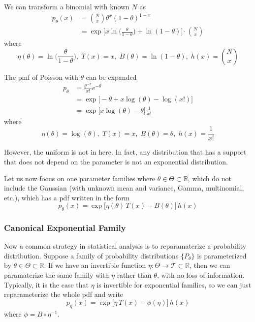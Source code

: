 \documentclass{article}
\begin{document}
    \begin{example}
    We can transform a binomial with known $N$ as 
    \begin{align*}
      p_\theta (x) &  = \binom{N}{x} \theta^x  (1 - \theta)^{1 - x} \\
                   & = \exp \bigg[ x \ln \big( \frac{\theta}{1 - \theta} \Big) + \ln(1 - \theta) \bigg] \cdot \binom{N}{x} 
    \end{align*}
    where 
      \[\eta (\theta) = \ln \big( \frac{\theta}{1 - \theta} \Big), \; T(x) = x, \; B(\theta) = \ln(1 - \theta), \; h(x) = \binom{N}{x}\]
    \end{example}

    \begin{example}[Poisson]
    The pmf of Poisson with $\theta$ can be expanded 
    \begin{align*}
        p_\theta & = \frac{\theta^{-x}}{x!} e^{-\theta} \\
        & = \exp \big[ -\theta + x\log(\theta) - \log(x!) \big] \\
        & = \exp \big[ x \log(\theta) - \theta \big] \, \frac{1}{x!}
    \end{align*}
    where 
    \[\eta(\theta) = \log(\theta), \; T(x) = x, \; B(\theta) = \theta, \; h(x) = \frac{1}{x!}\]
    \end{example}

    However, the uniform is not in here. In fact, any distribution that has a support that does not depend on the parameter is not an exponential distribution. 

    Let us now focus on one parameter families where $\theta \in \Theta \subset \mathbb{R}$, which do not include the Gaussian (with unknown mean and variance, Gamma, multinomial, etc.), which has a pdf written in the form 
    \[p_\theta (x) = \exp \big[ \eta (\theta) \, T(x) - B(\theta) \big] \, h(x)\]


    \subsubsection{Canonical Exponential Family}

      Now a common strategy in statistical analysis is to reparamaterize a probability distribution. Suppose a family of probability distributions $\{P_\theta\}$ is parameterized by $\theta \in \Theta \subset \mathbb{R}$. If we have an invertible function $\eta: \Theta \rightarrow \mathcal{T} \subset \mathbb{R}$, then we can paramaterize the same family with $\eta$ rather than $\theta$, with no loss of information. Typically, it is the case that $\eta$ is invertible for exponential families, so we can just reparameterize the whole pdf and write 
      \[p_\eta (x) = \exp \big[ \eta \, T(x) - \phi(\eta) \big] \, h(x)\]
      where $\phi = B \circ \eta^{-1}$. 
\end{document}
